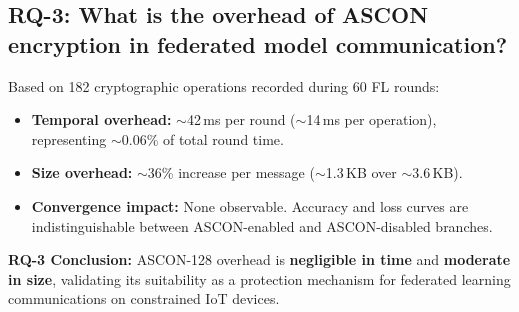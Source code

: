 \subsection{RQ-3: What is the overhead of ASCON encryption in federated model communication?}

Based on 182 cryptographic operations recorded during 60 FL rounds:
\begin{itemize}
    \item \textbf{Temporal overhead:} $\sim$42\,ms per round ($\sim$14\,ms per operation), representing $\sim$0.06\% of total round time.
    \item \textbf{Size overhead:} $\sim$36\% increase per message ($\sim$1.3\,KB over $\sim$3.6\,KB).
    \item \textbf{Convergence impact:} None observable. Accuracy and loss curves are indistinguishable between ASCON-enabled and ASCON-disabled branches.
\end{itemize}

\textbf{RQ-3 Conclusion:} ASCON-128 overhead is \textbf{negligible in time} and \textbf{moderate in size}, validating its suitability as a protection mechanism for federated learning communications on constrained IoT devices.
